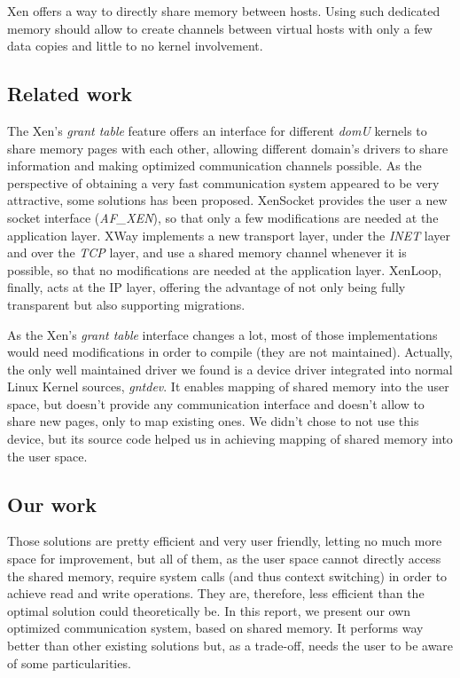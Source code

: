 \documentclass[journal]{IEEEtran}
\begin{document}


Xen offers a way to directly share memory between hosts.
Using such dedicated memory should allow to create channels between virtual hosts with only a few data copies and little to no kernel involvement.

\subsection{Related work}

The Xen's \emph{grant table} feature offers an interface for different \emph{domU} kernels to share memory pages with each other, allowing different domain's drivers to share information and making optimized communication channels possible. As the perspective of obtaining a very fast communication system appeared to be very attractive, some solutions has been proposed. XenSocket\cite{XenSocket} provides the user a new socket interface (\emph{AF\_XEN}), so that only a few modifications are needed at the application layer. XWay\cite{XWay} implements a new transport layer, under the \emph{INET} layer and over the \emph{TCP} layer, and use a shared memory channel whenever it is possible, so that no modifications are needed at the application layer. XenLoop\cite{XenLoop}, finally, acts at the IP layer, offering the advantage of not only being fully transparent but also supporting migrations. 

As the Xen's \emph{grant table} interface changes a lot, most of those implementations would need modifications in order to compile (they are not maintained). Actually, the only well maintained driver we found is a device driver integrated into normal Linux Kernel sources, \emph{gntdev}. It enables mapping of shared memory into the user space, but doesn't provide any communication interface and doesn't allow to share new pages, only to map existing ones. 
We didn't chose to not use this device, but its source code helped us in achieving mapping of shared memory into the user space. 

\subsection{Our work}

Those solutions are pretty efficient and very user friendly, letting no much more space for improvement, but all of them, as the user space cannot directly access the shared memory, require system calls (and thus context switching) in order to achieve read and write operations.
They are, therefore, less efficient than the optimal solution could theoretically be. 
In this report, we present our own optimized communication system, based on shared memory. It performs way better than other existing solutions but, as a trade-off, needs the user to be aware of some particularities.
\end{document}
